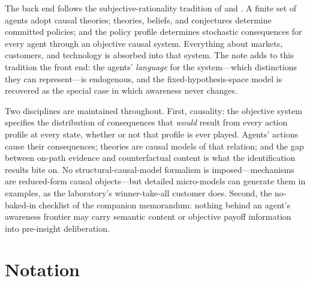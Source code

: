 \documentclass[11pt]{article}
\begin{document}
The back end follows the subjective-rationality tradition of
\citet{KalaiLehrer1993b} and \citet{Ryall2003}.  A finite set of agents adopt
causal theories; theories, beliefs, and conjectures determine committed
policies; and the policy profile determines stochastic consequences for every
agent through an objective causal system.  Everything about markets,
customers, and technology is absorbed into that system.  The note adds to this
tradition the front end: the agents' \emph{language} for the system---which
distinctions they can represent---is endogenous, and the fixed-hypothesis-space
model is recovered as the special case in which awareness never changes.

Two disciplines are maintained throughout.  First, causality: the objective
system specifies the distribution of consequences that \emph{would} result
from every action profile at every state, whether or not that profile is ever
played.  Agents' actions cause their consequences; theories are causal models
of that relation; and the gap between on-path evidence and counterfactual
content is what the identification results bite on.  No structural-causal-model
formalism is imposed---mechanisms are reduced-form causal objects---but
detailed micro-models can generate them in examples, as the laboratory's
winner-take-all customer does.  Second, the no-baked-in checklist of the
companion memorandum: nothing behind an agent's awareness frontier may carry
semantic content or objective payoff information into pre-insight
deliberation.

\section{Notation}
\end{document}
